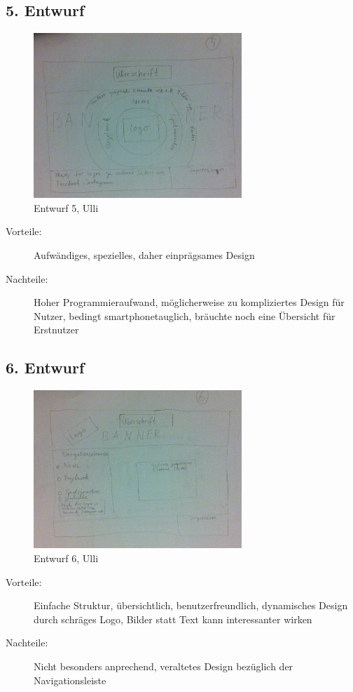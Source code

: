 \documentclass{scrartcl}
\begin{document}
\subsection*{5. Entwurf}
 \begin{figure}[H]
 \centering
   \includegraphics[width=0.7\textwidth]{Version5.jpg}
\caption{Entwurf 5, Ulli}
\end{figure}
 \begin{description}
 \item[Vorteile:]Aufwändiges, spezielles, daher einprägsames Design
 \item[Nachteile:] Hoher Programmieraufwand, möglicherweise zu kompliziertes Design für Nutzer, bedingt smartphonetauglich, bräuchte noch eine Übersicht für Erstnutzer
 \end{description}
 
\subsection*{6. Entwurf}
 \begin{figure}[H]
 \centering
   \includegraphics[width=0.7\textwidth]{Version6.jpg}
\caption{Entwurf 6, Ulli}
\end{figure}
 \begin{description}
 \item[Vorteile:]  Einfache Struktur, übersichtlich, benutzerfreundlich, dynamisches Design durch schräges Logo, Bilder statt Text kann interessanter wirken 
 \item[Nachteile:] Nicht besonders anprechend, veraltetes Design bezüglich der Navigationsleiste
 \end{description}
\end{document}
